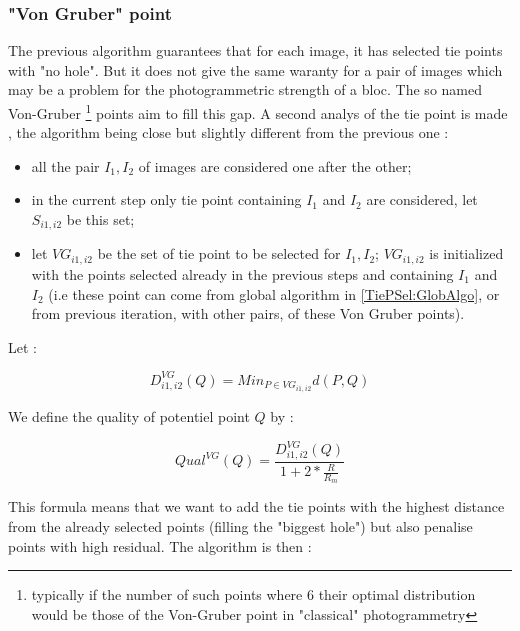 
\subsubsection{"Von Gruber" point}

The previous algorithm
guarantees that for each image, it has selected tie points with "no hole". But it does not
give the same waranty for a pair of images which may be a problem for the photogrammetric
strength of a bloc. The so named Von-Gruber \footnote{typically if the number of such points where $6$
their optimal distribution would be those of the Von-Gruber point in "classical" photogrammetry} 
points aim to fill
this gap. A second analys of the tie point is made , the algorithm being close
but slightly different from the previous one :


\begin{itemize}
   \item  all the pair  $I_1,I_2$ of images are considered  one after the other;

   \item  in the current step only tie point containing $I_1$ and $I_2$ are considered, let $S_{i1,i2}$ be this set;

   \item  let  $VG_{i1,i2}$ be the set  of tie point to be selected  for $I_1,I_2$;
          $VG_{i1,i2}$ is initialized with the points
          selected already in the previous steps and containing $I_1$ and $I_2$ 
          (i.e these point can come from global algorithm  in \ref{TiePSel:GlobAlgo}, or
          from  previous iteration, with other pairs, of these Von Gruber points).

\end{itemize}

Let :

\begin{equation}
 D^{VG}_{i1,i2}(Q)  = Min_{P \in VG_{i1,i2}} d(P,Q)
\end{equation}

We define the quality of potentiel point $Q$ by :


\begin{equation}
  Qual^{VG}(Q)  = \frac{D^{VG}_{i1,i2}(Q)}{1+2*\frac{R}{R_m}}
\end{equation}

This formula means that we want to add the tie points with the highest distance
from the already selected points (filling the "biggest hole") but also penalise points with high residual. The algorithm
is then :

